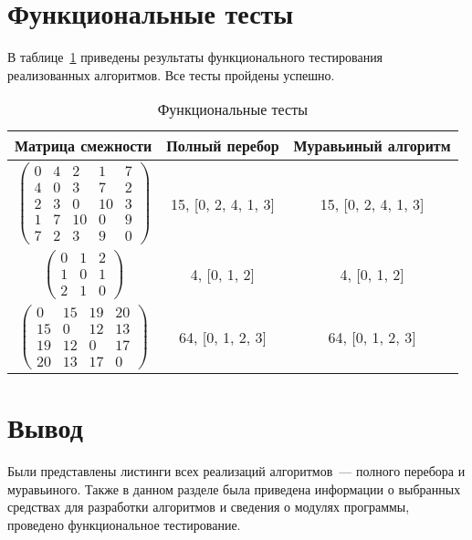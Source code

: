 \section{Функциональные тесты}

В таблице~\ref{tbl:func-tests} приведены результаты функционального тестирования реализованных алгоритмов.
Все тесты пройдены успешно.

\begin{table}[H]
	\caption{Функциональные тесты}
	\label{tbl:func-tests}
	\centering
	\begin{tabular}{|c|c|c|}
		\hline
		Матрица смежности & Полный перебор & Муравьиный алгоритм \\ \hline
		$ \begin{pmatrix}
			0 &  4 &  2 &  1 & 7 \\
			4 &  0 &  3 &  7 & 2 \\
			2 &  3 &  0 & 10 & 3 \\
			1 &  7 & 10 &  0 & 9 \\
			7 &  2 &  3 &  9 & 0
		\end{pmatrix}$ &
		15, [0, 2, 4, 1, 3] &
		15, [0, 2, 4, 1, 3] \\ \hline
		$ \begin{pmatrix}
			0 & 1 & 2 \\
			1 & 0 & 1 \\
			2 & 1 & 0	
		\end{pmatrix}$ &
		4, [0, 1, 2] &
		4, [0, 1, 2] \\ \hline
		$ \begin{pmatrix}
			0 & 15 & 19 & 20 \\
			15 &  0 & 12 & 13 \\
			19 & 12 &  0 & 17 \\
			20 & 13 & 17 &  0
		\end{pmatrix}$ &
		64, [0, 1, 2, 3] &
		64, [0, 1, 2, 3] \\ \hline
	\end{tabular}
\end{table}

\section*{Вывод}

Были представлены листинги всех реализаций алгоритмов~--- полного перебора и муравьиного.
Также в данном разделе была приведена информации о выбранных средствах для разработки алгоритмов и сведения о модулях программы, проведено функциональное тестирование.